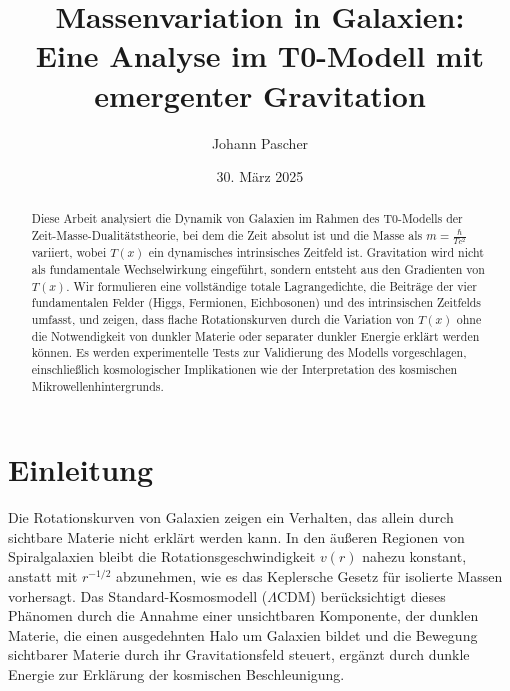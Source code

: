 \documentclass[12pt,a4paper]{article}
\title{Massenvariation in Galaxien: \\Eine Analyse im T0-Modell mit emergenter Gravitation}
\author{Johann Pascher}
\date{30. März 2025}
\newcommand{\Tfield}{T(x)}
\begin{document}
	
	\maketitle
	
	\begin{abstract}
		Diese Arbeit analysiert die Dynamik von Galaxien im Rahmen des T0-Modells der Zeit-Masse-Dualitätstheorie, bei dem die Zeit absolut ist und die Masse als \( m = \frac{\hbar}{T c^2} \) variiert, wobei \( \Tfield \) ein dynamisches intrinsisches Zeitfeld ist. Gravitation wird nicht als fundamentale Wechselwirkung eingeführt, sondern entsteht aus den Gradienten von \( \Tfield \). Wir formulieren eine vollständige totale Lagrangedichte, die Beiträge der vier fundamentalen Felder (Higgs, Fermionen, Eichbosonen) und des intrinsischen Zeitfelds umfasst, und zeigen, dass flache Rotationskurven durch die Variation von \( \Tfield \) ohne die Notwendigkeit von dunkler Materie oder separater dunkler Energie erklärt werden können. Es werden experimentelle Tests zur Validierung des Modells vorgeschlagen, einschließlich kosmologischer Implikationen wie der Interpretation des kosmischen Mikrowellenhintergrunds.
	\end{abstract}
	
	\tableofcontents
	\newpage
	
	\section{Einleitung}
	Die Rotationskurven von Galaxien zeigen ein Verhalten, das allein durch sichtbare Materie nicht erklärt werden kann. In den äußeren Regionen von Spiralgalaxien bleibt die Rotationsgeschwindigkeit \( v(r) \) nahezu konstant, anstatt mit \( r^{-1/2} \) abzunehmen, wie es das Keplersche Gesetz für isolierte Massen vorhersagt. Das Standard-Kosmosmodell (\(\Lambda\)CDM) berücksichtigt dieses Phänomen durch die Annahme einer unsichtbaren Komponente, der dunklen Materie, die einen ausgedehnten Halo um Galaxien bildet und die Bewegung sichtbarer Materie durch ihr Gravitationsfeld steuert, ergänzt durch dunkle Energie zur Erklärung der kosmischen Beschleunigung.
	
\end{document}
